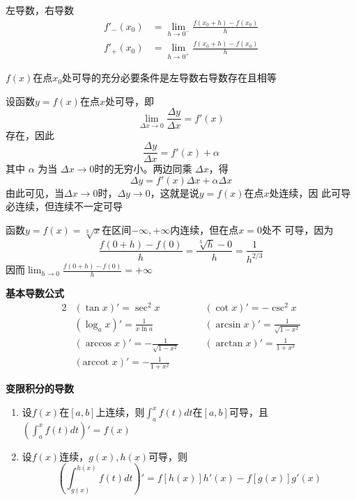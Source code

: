 \documentclass[11pt]{article}
\begin{document}
左导数，右导数
\begin{align*}
f'_-(x_0)&=\lim_{h\to0^-}\frac{f(x_0+h)-f(x_0)}{h}\\
f'_+(x_0)&=\lim_{h\to0^+}\frac{f(x_0+h)-f(x_0)}{h}
\end{align*}

\(f(x)\)在点\(x_0\)处可导的充分必要条件是左导数右导数存在且相等

设函数\(y=f(x)\)在点\(x\)处可导，即
\begin{equation*}
\lim_{\Delta x\to0}\frac{\Delta y}{\Delta x}=f'(x)
\end{equation*}
存在，因此
\begin{equation*}
\frac{\Delta y}{\Delta x}=f'(x)+\alpha
\end{equation*}
其中 \(\alpha\) 为当 \(\Delta x\to0\)时的无穷小。两边同乘 \(\Delta x\)，得
\begin{equation*}
\Delta y=f'(x)\Delta x+\alpha \Delta x
\end{equation*}
由此可见，当\(\Delta x\to0\)时，\(\Delta y\to0\)，这就是说\(y=f(x)\)在点\(x\)处连续，因
此可导必连续，但连续不一定可导

\begin{examplle}[]
函数\(y=f(x)=\sqrt[3]{x}\)在区间\(-\infty,+\infty\)内连续，但在点\(x=0\)处不
可导，因为
\begin{equation*}
\frac{f(0+h)-f(0)}{h}=\frac{\sqrt[3]{h}-0}{h}=\frac{1}{h^{2/3}}
\end{equation*}
因而\(\lim_{h\to0}\frac{f(0+h)-f(0)}{h}=+\infty\)
\end{examplle}

\textbf{基本导数公式}
\begin{alignat*}{2}
&(\tan x)'=\sec^2x&&(\cot x)'=-\csc^2x\\
&(\log_ax)'=\frac{1}{x\ln a}&&(\arcsin x)' = \frac{1}{\sqrt{1-x^2}}\\
&(\arccos x)' = -\frac{1}{\sqrt{1-x^2}}\quad&&
(\arctan x)' = \frac{1}{1+x^2}\\
&(\text{arccot } x)' = -\frac{1}{1+x^2}&&
\end{alignat*}

\textbf{变限积分的导数}
\begin{enumerate}
\item 设\(f(x)\)在\([a,b]\)上连续，则\(\int_a^xf(t)dt\)在\([a,b]\)可导，且
\(\displaystyle\left(\int_a^xf(t)dt\right)'=f(x)\)
\item 设\(f(x)\)连续，\(g(x),h(x)\)可导，则
\begin{equation*}
\left(\int_{g(x)}^{h(x)}f(t)dt
\right)'=f[h(x)]h'(x)-f[g(x)]g'(x)
\end{equation*}
\end{enumerate}
\end{document}
